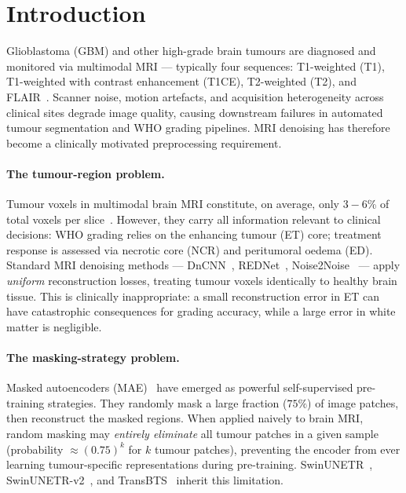 \documentclass[runningheads]{llncs}
\begin{document}


\section{Introduction}
\label{sec:intro}

Glioblastoma (GBM) and other high-grade brain tumours are diagnosed and
monitored via multimodal MRI — typically four sequences: T1-weighted (T1),
T1-weighted with contrast enhancement (T1CE), T2-weighted (T2), and
FLAIR~\cite{brats2021}. Scanner noise, motion artefacts, and acquisition
heterogeneity across clinical sites degrade image quality, causing downstream
failures in automated tumour segmentation and WHO grading pipelines.
MRI denoising has therefore become a clinically motivated preprocessing
requirement.

\paragraph{The tumour-region problem.}
Tumour voxels in multimodal brain MRI constitute, on average, only
$3\!-\!6$\% of total voxels per slice~\cite{brats2021}. However,
they carry all information relevant to clinical decisions: WHO grading
relies on the enhancing tumour (ET) core; treatment response is assessed
via necrotic core (NCR) and peritumoral oedema (ED). Standard MRI denoising
methods — DnCNN~\cite{dncnn}, REDNet~\cite{rednet}, Noise2Noise~\cite{n2n}
— apply \emph{uniform} reconstruction losses, treating tumour voxels
identically to healthy brain tissue. This is clinically inappropriate: a
small reconstruction error in ET can have catastrophic consequences for
grading accuracy, while a large error in white matter is negligible.

\paragraph{The masking-strategy problem.}
Masked autoencoders (MAE)~\cite{he2022mae} have emerged as powerful
self-supervised pre-training strategies. They randomly mask a large
fraction ($75\%$) of image patches, then reconstruct the masked regions.
When applied naively to brain MRI, random masking may \emph{entirely
eliminate} all tumour patches in a given sample (probability
$\approx (0.75)^k$ for $k$ tumour patches), preventing the encoder
from ever learning tumour-specific representations during pre-training.
SwinUNETR~\cite{swinunetr}, SwinUNETR-v2~\cite{swinunetrv2}, and
TransBTS~\cite{transbts} inherit this limitation.
\end{document}
